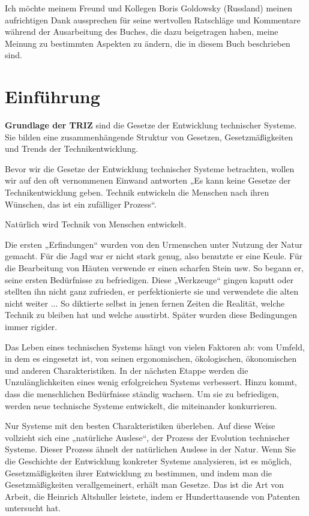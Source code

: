 \documentclass[11pt,a4paper]{article}
\begin{document}
Ich möchte meinem Freund und Kollegen Boris Goldowsky (Russland) meinen
aufrichtigen Dank aussprechen für seine wertvollen Ratschläge und Kommentare
während der Ausarbeitung des Buches, die dazu beigetragen haben, meine Meinung
zu bestimmten Aspekten zu ändern, die in diesem Buch beschrieben sind.

\section*{Einführung}

\textbf{Grundlage der TRIZ} sind die Gesetze der Entwicklung technischer
Systeme.  Sie bilden eine zusammenhängende Struktur von Gesetzen,
Gesetzmäßigkeiten und Trends der Technikentwicklung.

Bevor wir die Gesetze der Entwicklung technischer Systeme betrachten, wollen
wir auf den oft vernommenen Einwand antworten „Es kann keine Gesetze der
Technikentwicklung geben. Technik entwickeln die Menschen nach ihren Wünschen,
das ist ein zufälliger Prozess“.

Natürlich wird Technik von Menschen entwickelt.

Die ersten „Erfindungen“ wurden von den Urmenschen unter Nutzung der Natur
gemacht. Für die Jagd war er nicht stark genug, also benutzte er eine
Keule. Für die Bearbeitung von Häuten verwende er einen scharfen Stein usw. So
begann er, seine ersten Bedürfnisse zu befriedigen. Diese „Werkzeuge“ gingen
kaputt oder stellten ihn nicht ganz zufrieden, er perfektionierte sie und
verwendete die alten nicht weiter ... So diktierte selbst in jenen fernen
Zeiten die Realität, welche Technik zu bleiben hat und welche ausstirbt.
Später wurden diese Bedingungen immer rigider.

Das Leben eines technischen Systems hängt von vielen Faktoren ab: vom Umfeld,
in dem es eingesetzt ist, von seinen ergonomischen, ökologischen, ökonomischen
und anderen Charakteristiken. In der nächsten Etappe werden die
Unzulänglichkeiten eines wenig erfolgreichen Systems verbessert.  Hinzu kommt,
dass die menschlichen Bedürfnisse ständig wachsen. Um sie zu befriedigen,
werden neue technische Systeme entwickelt, die miteinander konkurrieren.

Nur Systeme mit den besten Charakteristiken überleben. Auf diese Weise
vollzieht sich eine „natürliche Auslese“, der Prozess der Evolution
technischer Systeme.  Dieser Prozess ähnelt der natürlichen Auslese in der
Natur. Wenn Sie die Geschichte der Entwicklung konkreter Systeme analysieren,
ist es möglich, Gesetzmäßigkeiten ihrer Entwicklung zu bestimmen, und indem
man die Gesetzmäßigkeiten verallgemeinert, erhält man Gesetze. Das ist die Art
von Arbeit, die Heinrich Altshuller leistete, indem er Hunderttausende von
Patenten untersucht hat.
\end{document}
